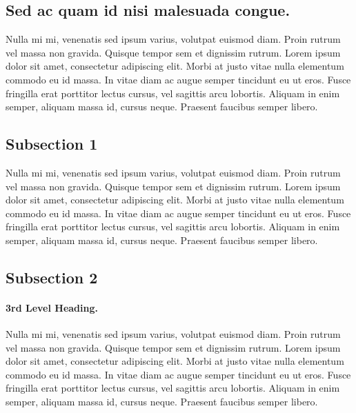 \documentclass[10pt,letterpaper]{article}
\begin{document}
\subsection*{Sed ac quam id nisi malesuada congue.}

Nulla mi mi, venenatis sed ipsum varius, volutpat euismod diam. Proin rutrum vel massa non gravida. Quisque tempor sem et dignissim rutrum. Lorem ipsum dolor sit amet, consectetur adipiscing elit. Morbi at justo vitae nulla elementum commodo eu id massa. In vitae diam ac augue semper tincidunt eu ut eros. Fusce fringilla erat porttitor lectus cursus, vel sagittis arcu lobortis. Aliquam in enim semper, aliquam massa id, cursus neque. Praesent faucibus semper libero.

\subsection*{Subsection 1}
Nulla mi mi, venenatis sed ipsum varius, volutpat euismod diam. Proin rutrum vel massa non gravida. Quisque tempor sem et dignissim rutrum. Lorem ipsum dolor sit amet, consectetur adipiscing elit. Morbi at justo vitae nulla elementum commodo eu id massa. In vitae diam ac augue semper tincidunt eu ut eros. Fusce fringilla erat porttitor lectus cursus, vel sagittis arcu lobortis. Aliquam in enim semper, aliquam massa id, cursus neque. Praesent faucibus semper libero.

\subsection*{Subsection 2}
\paragraph{3rd Level Heading.} Nulla mi mi, venenatis sed ipsum varius, volutpat euismod diam. Proin rutrum vel massa non gravida. Quisque tempor sem et dignissim rutrum. Lorem ipsum dolor sit amet, consectetur adipiscing elit. Morbi at justo vitae nulla elementum commodo eu id massa. In vitae diam ac augue semper tincidunt eu ut eros. Fusce fringilla erat porttitor lectus cursus, vel sagittis arcu lobortis. Aliquam in enim semper, aliquam massa id, cursus neque. Praesent faucibus semper libero.
\end{document}
